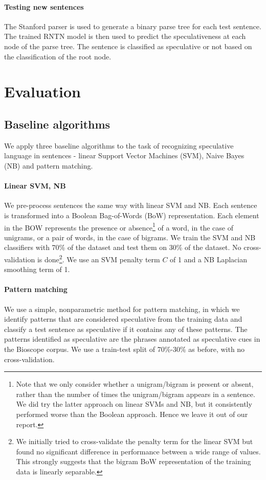 \documentclass{article}
\begin{document}
\paragraph{Testing new sentences} The Stanford parser is used to generate a binary parse tree for each test sentence. The trained RNTN model is then used to predict the speculativeness at each node of the parse tree. The sentence is classified as speculative or not based on the classification of the root node.

\section{Evaluation}

\subsection{Baseline algorithms}

We apply three baseline algorithms to the task of recognizing speculative language in sentences - linear Support Vector Machines (SVM), Naive Bayes (NB) and pattern matching.

\paragraph{Linear SVM, NB} We pre-process sentences the same way with linear SVM and NB. Each sentence is transformed into a Boolean Bag-of-Words (BoW) representation.  Each element in the BOW represents the presence or absence\footnote{Note that we only consider whether a unigram/bigram is present or absent, rather than the number of times the unigram/bigram appears in a sentence. We did try the latter approach on linear SVMs and NB, but it consistently performed worse than the Boolean approach. Hence we leave it out of our report.} of a word, in the case of unigrams, or a pair of words, in the case of bigrams. We train the SVM and NB classifiers with 70\% of the dataset and test them on 30\% of the dataset. No cross-validation is done\footnote{We initially tried to cross-validate the penalty term for the linear SVM but found no significant difference in performance between a wide range of values. This strongly suggests that the bigram BoW representation of the training data is linearly separable.}. We use an SVM penalty term $C$ of 1 and a NB Laplacian smoothing term of 1.

\paragraph{Pattern matching} We use a simple, nonparametric method for pattern matching, in which we identify patterns that are considered speculative from the training data and classify a test sentence as speculative if it contains any of these patterns. The patterns identified as speculative are the phrases annotated as speculative cues in the Bioscope corpus. We use a train-test split of 70\%-30\% as before, with no cross-validation.
\end{document}
